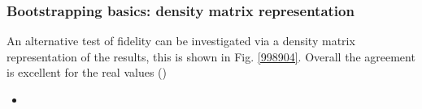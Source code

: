 \subsubsection{Bootstrapping basics: density matrix representation}

An alternative test of fidelity can be investigated via a density matrix representation of the results, this is shown in Fig. \ref{998904}. Overall the agreement is excellent for the real values ()

\begin{itemize}
\item 
\end{itemize}